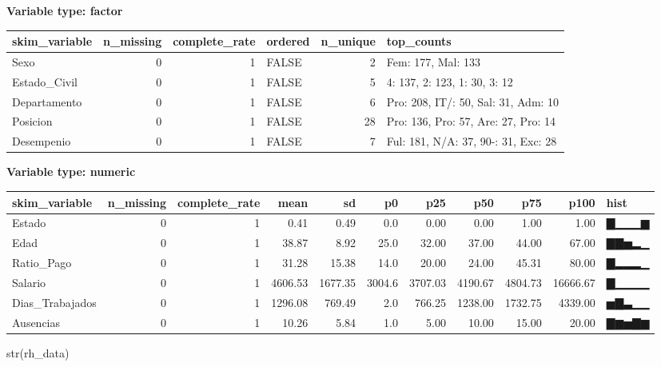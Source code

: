 \documentclass[
]{article}
\newenvironment{Shaded}{\begin{snugshade}}{\end{snugshade}}
\newcommand{\FunctionTok}[1]{\textcolor[rgb]{0.00,0.00,0.00}{#1}}
\newcommand{\NormalTok}[1]{#1}
\begin{document}
\textbf{Variable type: factor}

\begin{longtable}[]{@{}lrrlrl@{}}
\toprule
skim\_variable & n\_missing & complete\_rate & ordered & n\_unique &
top\_counts \\
\midrule
\endhead
Sexo & 0 & 1 & FALSE & 2 & Fem: 177, Mal: 133 \\
Estado\_Civil & 0 & 1 & FALSE & 5 & 4: 137, 2: 123, 1: 30, 3: 12 \\
Departamento & 0 & 1 & FALSE & 6 & Pro: 208, IT/: 50, Sal: 31, Adm:
10 \\
Posicion & 0 & 1 & FALSE & 28 & Pro: 136, Pro: 57, Are: 27, Pro: 14 \\
Desempenio & 0 & 1 & FALSE & 7 & Ful: 181, N/A: 37, 90-: 31, Exc: 28 \\
\bottomrule
\end{longtable}

\textbf{Variable type: numeric}

\begin{longtable}[]{@{}lrrrrrrrrrl@{}}
\toprule
skim\_variable & n\_missing & complete\_rate & mean & sd & p0 & p25 &
p50 & p75 & p100 & hist \\
\midrule
\endhead
Estado & 0 & 1 & 0.41 & 0.49 & 0.0 & 0.00 & 0.00 & 1.00 & 1.00 &
▇▁▁▁▆ \\
Edad & 0 & 1 & 38.87 & 8.92 & 25.0 & 32.00 & 37.00 & 44.00 & 67.00 &
▇▇▅▂▁ \\
Ratio\_Pago & 0 & 1 & 31.28 & 15.38 & 14.0 & 20.00 & 24.00 & 45.31 &
80.00 & ▇▂▂▂▁ \\
Salario & 0 & 1 & 4606.53 & 1677.35 & 3004.6 & 3707.03 & 4190.67 &
4804.73 & 16666.67 & ▇▁▁▁▁ \\
Dias\_Trabajados & 0 & 1 & 1296.08 & 769.49 & 2.0 & 766.25 & 1238.00 &
1732.75 & 4339.00 & ▅▇▃▁▁ \\
Ausencias & 0 & 1 & 10.26 & 5.84 & 1.0 & 5.00 & 10.00 & 15.00 & 20.00 &
▇▆▅▇▆ \\
\bottomrule
\end{longtable}

\begin{Shaded}
\begin{Highlighting}[]
\FunctionTok{str}\NormalTok{(rh\_data)}
\end{Highlighting}
\end{Shaded}
\end{document}
